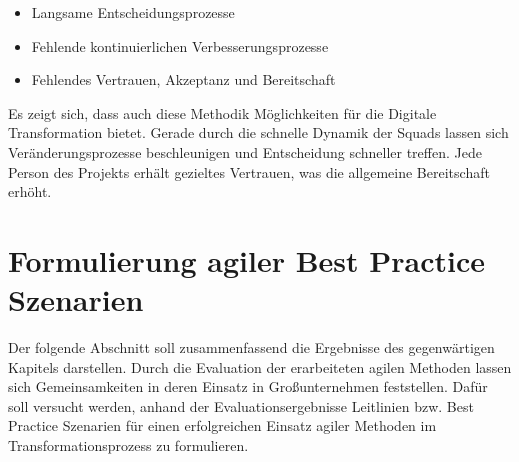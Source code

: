  \begin{itemize}[noitemsep, topsep=0pt]
 	\item Langsame Entscheidungsprozesse
 	\item Fehlende kontinuierlichen Verbesserungsprozesse
 	\item Fehlendes Vertrauen, Akzeptanz und Bereitschaft
 \end{itemize}

Es zeigt sich, dass auch diese Methodik Möglichkeiten für die Digitale Transformation bietet. Gerade durch die schnelle Dynamik der Squads lassen sich Veränderungsprozesse beschleunigen und Entscheidung schneller treffen. Jede Person des Projekts erhält gezieltes Vertrauen, was die allgemeine Bereitschaft erhöht.

\section{Formulierung agiler Best Practice Szenarien}
\label{agilepractices:bestpractice}


Der folgende Abschnitt soll zusammenfassend die Ergebnisse des gegenwärtigen Kapitels darstellen. Durch die Evaluation der erarbeiteten agilen Methoden lassen sich Gemeinsamkeiten in deren Einsatz in Großunternehmen feststellen. Dafür soll versucht werden, anhand der Evaluationsergebnisse Leitlinien bzw. Best Practice Szenarien für einen erfolgreichen Einsatz agiler Methoden im Transformationsprozess zu formulieren. 

